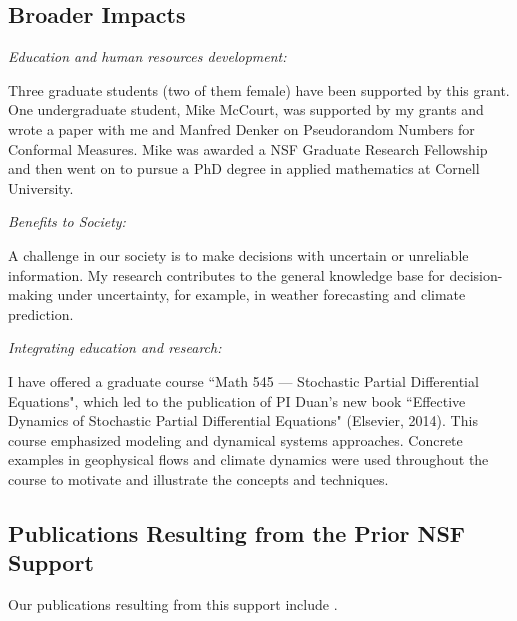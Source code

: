 \documentclass[11pt]{article}
\begin{document}
\subsection*{Broader Impacts}


\hspace{0.5cm} \emph{Education and human resources development:}

Three graduate students (two of them female) have been supported     by this   grant.   One undergraduate student,   Mike
McCourt, was   supported by my grants and     wrote a paper with me
and Manfred Denker on  Pseudorandom Numbers for Conformal
Measures. Mike
was awarded a NSF Graduate Research Fellowship and then went on to pursue
  a PhD    degree in applied mathematics at Cornell University.


\medskip

 \emph{Benefits to Society:}

A challenge in our society is to make decisions with uncertain or unreliable
information. My research contributes to the general knowledge base
for decision-making  under uncertainty, for example, in
 weather forecasting and climate prediction.




\medskip

 \emph{Integrating education and research:}

I have   offered a  graduate course ``Math 545 ---  Stochastic
Partial Differential Equations", which led to the publication of PI Duan's new book
``Effective Dynamics of Stochastic Partial Differential Equations" (Elsevier, 2014).   This course   emphasized modeling and dynamical systems approaches.   Concrete examples in geophysical flows
and climate dynamics were used throughout  the course to motivate and illustrate the concepts and techniques.





\subsection*{Publications Resulting from the Prior NSF Support}
 Our publications resulting from this support include  \cite{DuanAML2010,  ChenDuan2010,  SunDuanLi2010, SunDuan2, SunDuan3,   ChenDuanFu,  JYangDuan,  LiuDuan1, YongXuDuan, YongXu,  HaoDuan2, RenDuan2,   Qiao, Qiao3, GaoTing2014}.
\end{document}
